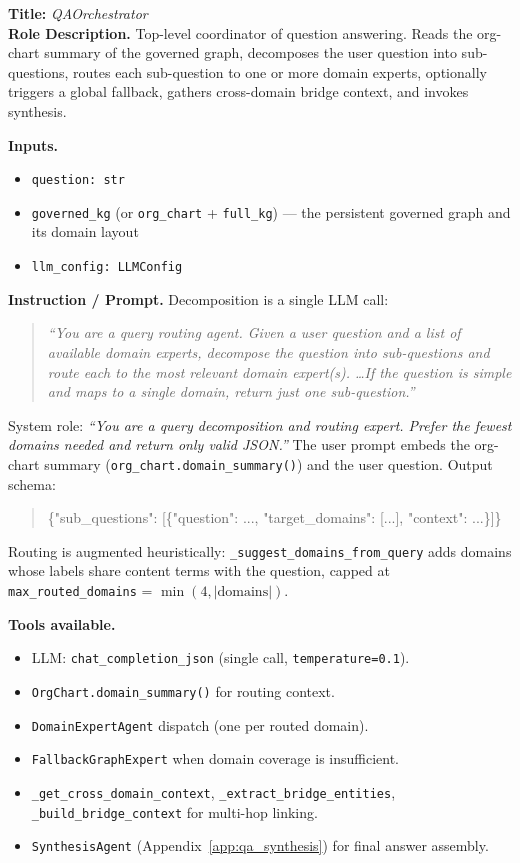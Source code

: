 \documentclass{article}
\begin{document}
\begin{agentbox}
\textbf{Title:} \textit{QAOrchestrator}\\
\textbf{Role Description.} Top-level coordinator of question answering.
Reads the org-chart summary of the governed graph, decomposes the user
question into sub-questions, routes each sub-question to one or more
domain experts, optionally triggers a global fallback, gathers
cross-domain bridge context, and invokes synthesis.

\textbf{Inputs.}
\begin{itemize}[leftmargin=*,nosep]
\item \texttt{question: str}
\item \texttt{governed\_kg} (or \texttt{org\_chart} + \texttt{full\_kg}) --- the persistent governed graph and its domain layout
\item \texttt{llm\_config: LLMConfig}
\end{itemize}

\textbf{Instruction / Prompt.} Decomposition is a single LLM call:
\begin{quote}\small\itshape
``You are a query routing agent. Given a user question and a list of
available domain experts, decompose the question into sub-questions
and route each to the most relevant domain expert(s). \ldots If the
question is simple and maps to a single domain, return just one
sub-question.''
\end{quote}
System role: \textit{``You are a query decomposition and routing
expert. Prefer the fewest domains needed and return only valid JSON.''}
The user prompt embeds the org-chart summary
(\texttt{org\_chart.domain\_summary()}) and the user question. Output
schema:
\begin{quote}\footnotesize\ttfamily
\{"sub\_questions": [\{"question": ..., "target\_domains": [...], "context": ...\}]\}
\end{quote}
Routing is augmented heuristically: \texttt{\_suggest\_domains\_from\_query} adds domains whose labels share content terms with the question, capped at \texttt{max\_routed\_domains} = $\min(4, |\text{domains}|)$.

\textbf{Tools available.}
\begin{itemize}[leftmargin=*,nosep]
\item LLM: \texttt{chat\_completion\_json} (single call, \texttt{temperature=0.1}).
\item \texttt{OrgChart.domain\_summary()} for routing context.
\item \texttt{DomainExpertAgent} dispatch (one per routed domain).
\item \texttt{FallbackGraphExpert} when domain coverage is insufficient.
\item \texttt{\_get\_cross\_domain\_context}, \texttt{\_extract\_bridge\_entities}, \texttt{\_build\_bridge\_context} for multi-hop linking.
\item \texttt{SynthesisAgent} (Appendix~\ref{app:qa_synthesis}) for final answer assembly.
\end{itemize}


\end{agentbox}
\end{document}
